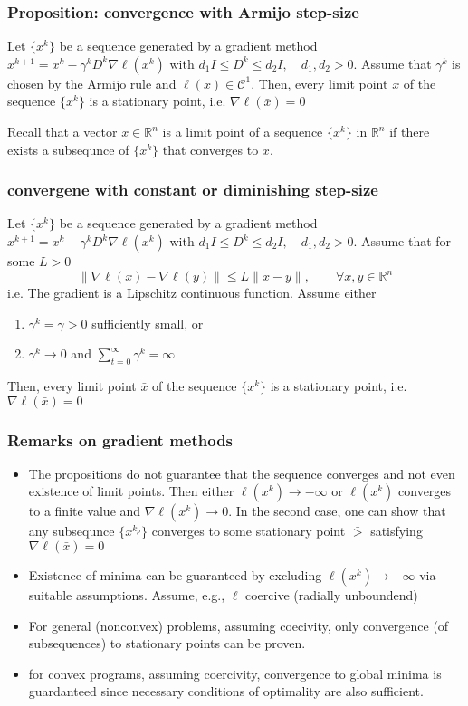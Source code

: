 \documentclass{book}
\newcommand{\R}{\mathbb{R}}
\theoremstyle{definition}
\theoremstyle{remark}
\theoremstyle{remark}
\begin{document}
\subsubsection{Proposition: convergence with Armijo step-size}
Let $\{x^k\}$ be a sequence generated by a gradient method $x^{k+1}=x^k-\gamma^kD^k\nabla\ell(x^k)$ with $d_1I\leq D^k \leq d_2I, \quad d_1,d_2>0$. Assume that $\gamma^k$ is chosen by the Armijo rule and $\ell(x)\in \mathcal{C}^1$. Then, every limit point $\bar{x}$ of the sequence $\{x^k\}$ is a stationary point, i.e. $\nabla\ell(\bar{x})=0$

Recall that a vector $x\in\R^n$ is a limit point of a sequence $\{x^k\}$ in $\R^n$ if there exists a subsequnce of $\{x^k\}$ that converges to $x$.

\subsubsection{convergene with constant or diminishing step-size}
Let $\{x^k\}$ be a sequence generated by a gradient method $x^{k+1}=x^k-\gamma^kD^k\nabla\ell(x^k)$ with $d_1I\leq D^k \leq d_2I, \quad d_1,d_2>0$. Assume that for some $L>0$ 
\[
    \|\nabla\ell(x)-\nabla\ell(y)\|\leq L\|x-y\|, \qquad \forall x,y\in\R^n
\]
i.e. The gradient is a Lipschitz continuous function.
Assume either
\begin{enumerate}
    \item $\gamma^k=\gamma>0$ sufficiently small, or 
    \item $\gamma^k\to 0$ and $\displaystyle\sum_{t=0}^{\infty}\gamma^k=\infty$
\end{enumerate}
Then, every limit point $\bar{x}$ of the sequence $\{x^k\}$ is a stationary point, i.e. $\nabla\ell(\bar{x})=0$

\subsubsection{Remarks on gradient methods}
\begin{itemize}
    \item The propositions do not guarantee that the sequence converges and not even existence of limit points. Then either $\ell(x^k)\to-\infty$ or $\ell(x^k)$ converges to a finite value and $\nabla\ell(x^k)\to 0$. In the second case, one can show that any subsequnce $\{x^{k_p}\}$ converges to some stationary point $\bar{>}$ satisfying $\nabla\ell(\bar{x})=0$
    \item Existence of minima can be guaranteed by excluding $\ell(x^k)\to-\infty$ via suitable assumptions. Assume, e.g., $\ell$ coercive (radially unboundend)
    \item For general (nonconvex) problems, assuming coecivity, only convergence (of subsequences) to stationary points can be proven.
    \item for convex programs, assuming coercivity, convergence to global minima is guardanteed since necessary conditions of optimality are also sufficient.
\end{itemize}
\end{document}
